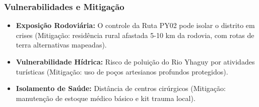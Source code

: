 \subsubsection{Vulnerabilidades e
Mitigação}

\begin{itemize}
\tightlist
\item
  \textbf{Exposição Rodoviária:} O controle da Ruta PY02 pode isolar o
  distrito em crises (Mitigação: residência rural afastada 5-10 km da
  rodovia, com rotas de terra alternativas mapeadas).
\item
  \textbf{Vulnerabilidade Hídrica:} Risco de poluição do Rio Yhaguy por
  atividades turísticas (Mitigação: uso de poços artesianos profundos
  protegidos).
\item
  \textbf{Isolamento de Saúde:} Distância de centros cirúrgicos
  (Mitigação: manutenção de estoque médico básico e kit trauma local).
\end{itemize}

